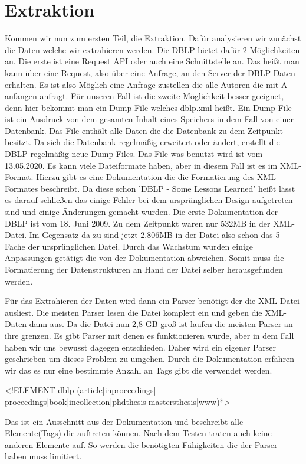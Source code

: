 \section{Extraktion}
Kommen wir nun zum ersten Teil, die Extraktion. Dafür analysieren wir zunächst die Daten welche wir extrahieren werden. Die DBLP bietet dafür 2 Möglichkeiten an. Die erste ist eine Request API oder auch eine Schnittstelle an. Das heißt man kann über eine Request, also über eine Anfrage, an den Server der DBLP Daten erhalten. Es ist also Möglich eine Anfrage zustellen die alle Autoren die mit A anfangen anfragt. Für unseren Fall ist die zweite Möglichkeit besser geeignet, denn hier bekommt man ein Dump File welches dblp.xml heißt. Ein Dump File ist ein Ausdruck von dem gesamten Inhalt eines Speichers in dem Fall von einer Datenbank. Das File enthält alle Daten die die Datenbank zu dem Zeitpunkt besitzt. Da sich die Datenbank regelmäßig erweitert oder ändert, erstellt die DBLP regelmäßig neue Dump Files. Das File was benutzt wird ist vom 13.05.2020. Es kann viele Dateiformate haben, aber in diesem Fall ist es im XML-Format. Hierzu gibt es eine Dokumentation die die Formatierung des XML-Formates beschreibt. Da diese schon 'DBLP - Some Lessons Learned' heißt lässt es darauf schließen das einige Fehler bei dem ursprünglichen Design aufgetreten sind und einige Änderungen gemacht wurden. Die erste Dokumentation der DBLP ist vom 18. Juni 2009. Zu dem Zeitpunkt waren nur 532MB in der XML-Datei. Im Gegensatz da zu sind jetzt 2.806MB in der Datei also schon das 5-Fache der ursprünglichen Datei. Durch das Wachstum wurden einige Anpassungen getätigt die von der Dokumentation abweichen. Somit muss die Formatierung der Datenstrukturen an Hand der Datei selber herausgefunden werden. 

Für das Extrahieren der Daten wird dann ein Parser benötigt der die XML-Datei ausliest. Die meisten Parser lesen die Datei komplett ein und geben die XML-Daten dann aus. Da die Datei nun 2,8 GB groß ist laufen die meisten Parser an ihre grenzen. Es gibt Parser mit denen es funktionieren würde, aber in dem Fall haben wir uns bewusst dagegen entschieden. Daher wird ein eigener Parser geschrieben um dieses Problem zu umgehen. Durch die Dokumentation erfahren wir das es nur eine bestimmte Anzahl an Tags gibt die verwendet werden.
\begin{center}
	<!ELEMENT dblp (article|inproceedings| proceedings|book|incollection|phdthesis|mastersthesis|www)*>
\end{center}

Das ist ein Ausschnitt aus der Dokumentation und beschreibt alle Elemente(Tags) die auftreten können. Nach dem Testen traten auch keine anderen Elemente auf. So werden die benötigten Fähigkeiten die der Parser haben muss limitiert.

